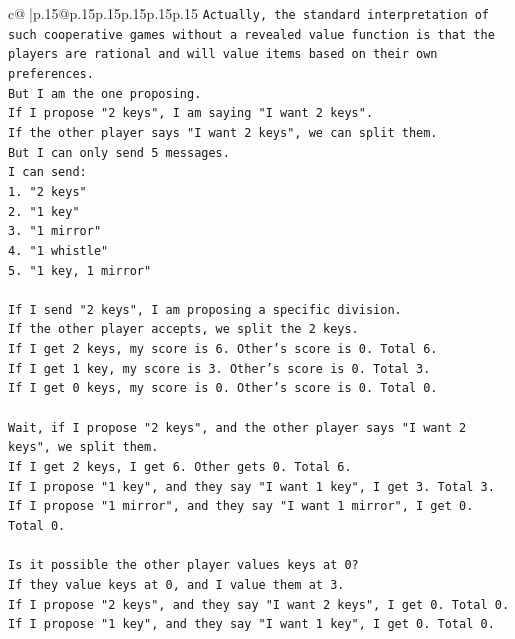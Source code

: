 \documentclass{article}
\begin{document}
{\begin{supertabular}{c@{$\;$}|p{.15\linewidth}@{}p{.15\linewidth}p{.15\linewidth}p{.15\linewidth}p{.15\linewidth}p{.15\linewidth}}
{{{\texttt{Actually, the standard interpretation of such cooperative games without a revealed value function is that the players are rational and will value items based on their own preferences.} \\
\texttt{But I am the one proposing.} \\
\texttt{If I propose "2 keys", I am saying "I want 2 keys".} \\
\texttt{If the other player says "I want 2 keys", we can split them.} \\
\texttt{But I can only send 5 messages.} \\
\texttt{I can send:} \\
\texttt{1. "2 keys"} \\
\texttt{2. "1 key"} \\
\texttt{3. "1 mirror"} \\
\texttt{4. "1 whistle"} \\
\texttt{5. "1 key, 1 mirror"} \\
\\ 
\texttt{If I send "2 keys", I am proposing a specific division.} \\
\texttt{If the other player accepts, we split the 2 keys.} \\
\texttt{If I get 2 keys, my score is 6. Other's score is 0. Total 6.} \\
\texttt{If I get 1 key, my score is 3. Other's score is 0. Total 3.} \\
\texttt{If I get 0 keys, my score is 0. Other's score is 0. Total 0.} \\
\\ 
\texttt{Wait, if I propose "2 keys", and the other player says "I want 2 keys", we split them.} \\
\texttt{If I get 2 keys, I get 6. Other gets 0. Total 6.} \\
\texttt{If I propose "1 key", and they say "I want 1 key", I get 3. Total 3.} \\
\texttt{If I propose "1 mirror", and they say "I want 1 mirror", I get 0. Total 0.} \\
\\ 
\texttt{Is it possible the other player values keys at 0?} \\
\texttt{If they value keys at 0, and I value them at 3.} \\
\texttt{If I propose "2 keys", and they say "I want 2 keys", I get 0. Total 0.} \\
\texttt{If I propose "1 key", and they say "I want 1 key", I get 0. Total 0.} \\
}}}
\end{supertabular}}
\end{document}
